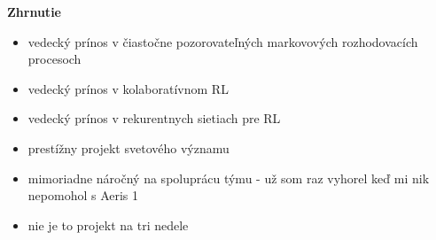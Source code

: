 \documentclass[10pt,a4paper]{article}
\newcommand\pro{\item[{\bf \color{green} +}]}
\newcommand\con{\item[{\bf \color{red} -}]}
\begin{document}
{\bf Zhrnutie}

\begin{itemize}
    \pro vedecký prínos v čiastočne pozorovateľných markovových rozhodovacích procesoch
    \pro vedecký prínos v kolaboratívnom RL
    \pro vedecký prínos v rekurentnych sietiach pre RL
    \pro prestížny projekt svetového významu
    \con mimoriadne náročný na spoluprácu týmu - už som raz vyhorel keď mi nik nepomohol s Aeris 1
    \con nie je to projekt na tri nedele
\end{itemize}
\end{document}

